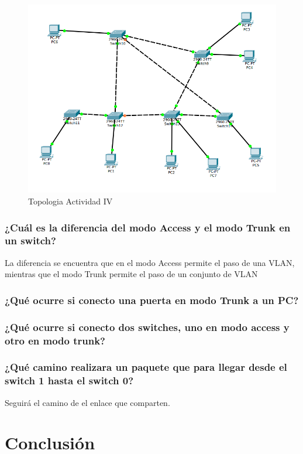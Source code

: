 \documentclass[spanish]{udpreport}
\begin{document}
\begin{figure}[H]
	\caption{Topologia Actividad IV}
	\label{fig:Figura 2.4}
	\centering
	\includegraphics[scale=.6, bb=0 0 30 30]{imagenes/A4e.png}
	\linebreak
\end{figure}

\subsection{¿Cuál es la diferencia del modo Access y el modo Trunk en un switch?}
La diferencia se encuentra que en el modo Access permite el paso de una VLAN, mientras que el modo Trunk permite el paso de un conjunto de VLAN

\subsection{¿Qué ocurre si conecto una puerta en modo Trunk a un PC?}

\subsection{¿Qué ocurre si conecto dos switches, uno en modo access y otro en modo trunk?}

\subsection{¿Qué camino realizara un paquete que para llegar desde el switch 1 hasta el switch 0?}

Seguirá el camino de el enlace que comparten.

\chapter{Conclusión}
\listoffigures
\end{document}
